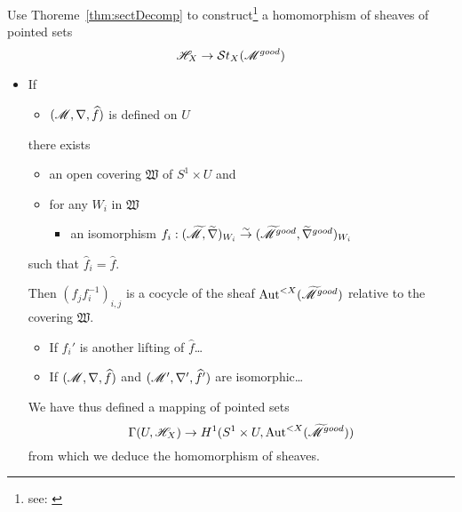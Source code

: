 Use Thoreme~\ref{thm:sectDecomp} to construct\footnote{see:
\cite[p. 111f]{sabbah2007isomonodromic}} a homomorphism of sheaves of
pointed sets
\[
  \mathscr{H}_X\to\mathcal{S}{}t_X(\mathscr{M}^{good})
\]
\begin{itemize}
  \item If \begin{itemize}
      \item $(\mathscr{M},\nabla,\widehat f)$ is defined on $U$
    \end{itemize}
    there exists
    \begin{itemize}
      \item an open covering $\mathfrak{W}$ of $S^1\times U$ and
      \item for any $W_i$ in $\mathfrak{W}$
        \begin{itemize}
          \item an isomorphism
            $f_i:(\widetilde{\mathscr{M}},\widetilde\nabla)_{W_i}
              \overset{\sim}{\to}
              (\widetilde{\mathscr{M}}^{good},\widetilde\nabla^{good})_{W_i}$
        \end{itemize}
    \end{itemize}
    such that $\hat f_i=\hat f$.

    Then $(f_jf_i^{-1})_{i,j}$ is a cocycle of the sheaf
    $\operatorname{Aut}^{<X}(\widetilde{\mathscr{M}}^{good})$ relative to the covering $\mathfrak{W}$.
    \begin{itemize}
      \item If $f_i'$ is another lifting of $\hat f$\dots
      \item If $(\mathscr{M},\nabla,\widehat f)$ and $(\mathscr{M}',\nabla',\widehat f')$ are
        isomorphic\dots
    \end{itemize}
    We have thus defined a mapping of pointed sets
    \[
      \Gamma(U,\mathscr{H}_X)\to H^1(S^1\times U,\operatorname{Aut}^{<X}(\widetilde{\mathscr{M}}^{good}))
    \]
    from which we deduce the homomorphism of sheaves.
\end{itemize}

